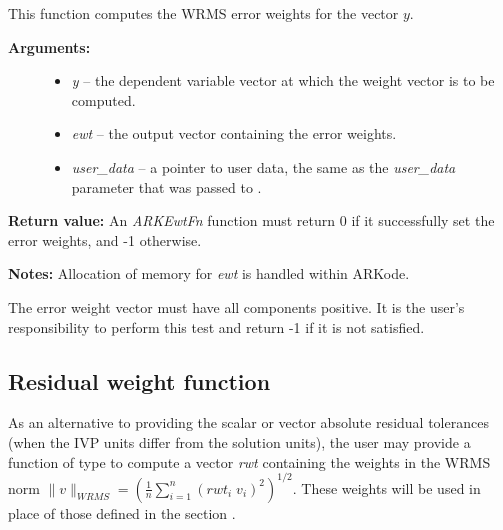 \documentclass[letterpaper,10pt,english]{sphinxmanual}
\begin{document}
\begin{fulllineitems}
\label{c_interface/User_supplied:c.ARKEwtFn}
This function computes the WRMS error weights for the vector
\(y\).
\begin{description}
\item[{\textbf{Arguments:}}] \leavevmode\begin{itemize}
\item {} 
\emph{y} -- the dependent variable vector at which the
weight vector is to be computed.

\item {} 
\emph{ewt} -- the output vector containing the error weights.

\item {} 
\emph{user\_data} -- a pointer to user data, the same as the
\emph{user\_data} parameter that was passed to {\hyperref[c_interface/User_callable:c.ARKodeSetUserData]{\emph{}}}.

\end{itemize}

\end{description}

\textbf{Return value:}
An \emph{ARKEwtFn} function must return 0 if it
successfully set the error weights, and -1 otherwise.

\textbf{Notes:} Allocation of memory for \emph{ewt} is handled within ARKode.

The error weight vector must have all components positive.  It is
the user's responsibility to perform this test and return -1 if it
is not satisfied.

\end{fulllineitems}



\subsection{Residual weight function}
\label{c_interface/User_supplied:cinterface-residualweight}\label{c_interface/User_supplied:residual-weight-function}
As an alternative to providing the scalar or vector absolute residual
tolerances (when the IVP units differ from the solution units), the
user may provide a function of type {\hyperref[c_interface/User_supplied:c.ARKRwtFn]{\emph{}}} to compute a
vector \emph{rwt} containing the weights in the WRMS norm
\(\|v\|_{WRMS} = \left(\frac{1}{n} \sum_{i=1}^n \left(rwt_i\; v_i\right)^2
\right)^{1/2}\).  These weights will be used in place of those defined
in the section {\hyperref[Mathematics:mathematics-error-norm]{\emph{}}}.
\end{document}
